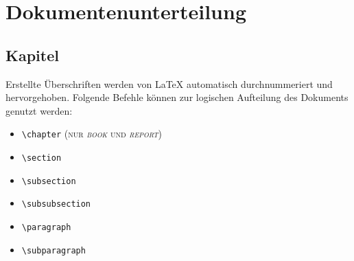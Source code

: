 \chapter{Dokumentenunterteilung}

\section{Kapitel}
Erstellte Überschriften werden von \LaTeX{} automatisch durchnummeriert und hervorgehoben. Folgende Befehle können zur logischen Aufteilung des Dokuments genutzt werden:
\begin{itemize}
\item \verb=\chapter= (\textsc{nur \textsl{book} und \textsl{report}})
\item \verb=\section=
\item \verb=\subsection=
\item \verb=\subsubsection=
\item \verb=\paragraph=
\item \verb=\subparagraph=
\end{itemize}

